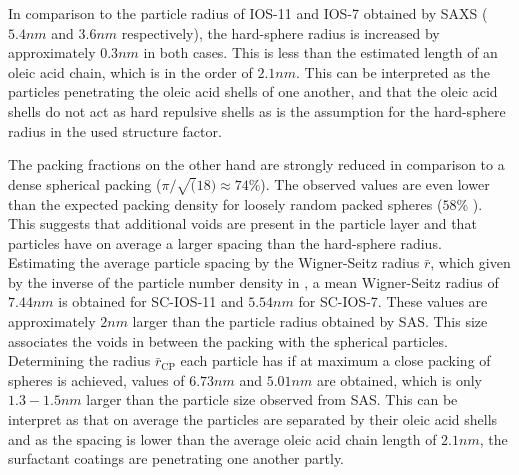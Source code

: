 \documentclass[\main/dresen_thesis.tex]{subfiles}
\begin{document}
  In comparison to the particle radius of IOS-11 and IOS-7 obtained by SAXS ($5.4 \unit{nm}$ and $3.6 \unit{nm}$ respectively), the hard-sphere radius is increased by approximately $0.3 \unit{nm}$ in both cases.
  This is less than the estimated length of an oleic acid chain, which is in the order of $2.1 \unit{nm}$.
  This can be interpreted as the particles penetrating the oleic acid shells of one another, and that the oleic acid shells do not act as hard repulsive shells as is the assumption for the hard-sphere radius in the used structure factor.

  The packing fractions on the other hand are strongly reduced in comparison to a dense spherical packing ($\pi / \sqrt(18) \approx 74 \%$).
  The observed values are even lower than the expected packing density for loosely random packed spheres ($58 \%$ \cite{Tory_1973_Simul, Shi_2008_Simul}).
  This suggests that additional voids are present in the particle layer and that particles have on average a larger spacing than the hard-sphere radius.
  Estimating the average particle spacing by the Wigner-Seitz radius $\bar{r}$, which given by the inverse of the particle number density in , a mean Wigner-Seitz radius of $7.44 \unit{nm}$ is obtained for SC-IOS-11 and $5.54 \unit{nm}$ for SC-IOS-7.
  These values are approximately $2 \unit{nm}$ larger than the particle radius obtained by SAS.
  This size associates the voids in between the packing with the spherical particles.
  Determining the radius $\bar{r}_\mathrm{CP}$ each particle has if at maximum a close packing of spheres is achieved, values of $6.73 \unit{nm}$ and $5.01 \unit{nm}$ are obtained, which is only $1.3 - 1.5 \unit{nm}$ larger than the particle size observed from SAS.
  This can be interpret as that on average the particles are separated by their oleic acid shells and as the spacing is lower than the average oleic acid chain length of $2.1 \unit{nm}$, the surfactant coatings are penetrating one another partly.

\end{document}

